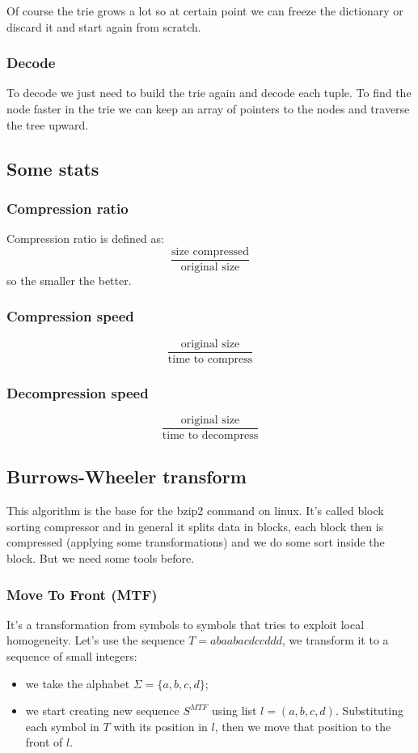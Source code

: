 Of course the trie grows a lot so at certain point we can freeze the dictionary  or discard it and start again from scratch.

\subsubsection{Decode}
To decode we just need to build the trie again and decode each tuple.
To find the node faster in the trie we can keep an array of pointers to the nodes and traverse the tree upward.

\subsection{Some stats}
\subsubsection{Compression ratio}
Compression ratio is defined as:
$$
    \frac{\text{size compressed}}{\text{original size}}
$$
so the smaller the better.

\subsubsection{Compression speed}
$$
    \frac{\text{original size}}{\text{time to compress}}
$$

\subsubsection{Decompression speed}
$$
    \frac{\text{original size}}{\text{time to decompress}}
$$

\subsection{Burrows-Wheeler transform}
This algorithm is the base for the bzip2 command on linux.
It's called block sorting compressor and in general it splits data in blocks, each block then is compressed (applying some transformations) and we do some sort inside the block.
But we need some tools before.

\subsubsection{Move To Front (MTF)}
It's a transformation from symbols to symbols that tries to exploit local homogeneity.
Let's use the sequence $T = abaabacdccddd$, we transform it to a sequence of small integers:
\begin{itemize}
    \item we take the alphabet $\Sigma = \{a, b, c, d\}$;
    \item we start creating new sequence $S^{MTF}$ using list $l = (a, b, c, d)$.
    Substituting each symbol in $T$ with its position in $l$, then we move that position to the front of $l$.
\end{itemize}

